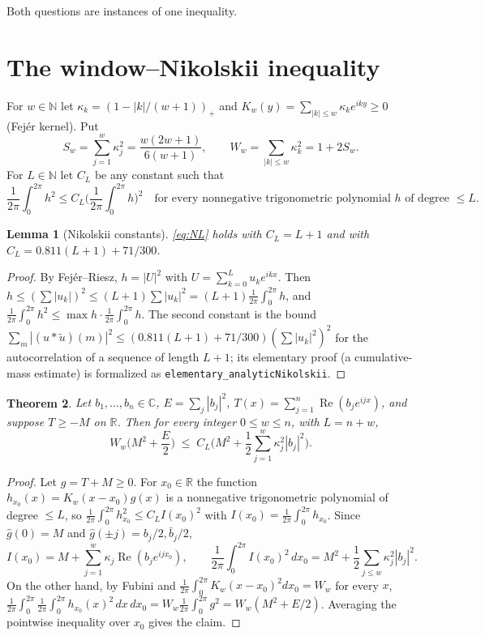\documentclass[11pt]{amsart}
\newtheorem{theorem}{Theorem}
\newtheorem{lemma}[theorem]{Lemma}
\theoremstyle{remark}
\newcommand{\R}{\mathbb{R}}
\newcommand{\N}{\mathbb{N}}
\newcommand{\avg}{\frac{1}{2\pi}\int_0^{2\pi}}
\begin{document}
Both questions are instances of one inequality.

\section{The window--Nikolskii inequality}
For $w\in\N$ let $\kappa_k=(1-|k|/(w+1))_+$ and $K_w(y)=\sum_{|k|\le w}\kappa_ke^{iky}\ge0$ (Fej\'er kernel). Put
\[
S_w=\sum_{j=1}^{w}\kappa_j^2=\frac{w(2w+1)}{6(w+1)},\qquad W_w=\sum_{|k|\le w}\kappa_k^2=1+2S_w .
\]
For $L\in\N$ let $C_L$ be any constant such that
\begin{equation}\label{eq:NL}
\avg h^2\le C_L\Big(\avg h\Big)^2\quad\text{for every nonnegative trigonometric polynomial $h$ of degree $\le L$.}
\end{equation}

\begin{lemma}[Nikolskii constants]\label{lem:nik}
\eqref{eq:NL} holds with $C_L=L+1$ and with $C_L=0.811(L+1)+71/300$.
\end{lemma}
\begin{proof}
By Fej\'er--Riesz, $h=|U|^2$ with $U=\sum_{k=0}^{L}u_ke^{ikx}$. Then $h\le(\sum|u_k|)^2\le(L+1)\sum|u_k|^2
=(L+1)\avg h$, and $\avg h^2\le\max h\cdot\avg h$. The second constant is the bound
$\sum_m|(u*\tilde u)(m)|^2\le(0.811(L+1)+71/300)(\sum|u_k|^2)^2$ for the autocorrelation of a sequence of length
$L+1$; its elementary proof (a cumulative-mass estimate) is formalized as \texttt{elementary\_analyticNikolskii}.
\end{proof}

\begin{theorem}\label{thm:main}
Let $b_1,\dots,b_n\in\mathbb C$, $E=\sum_j|b_j|^2$, $T(x)=\sum_{j=1}^n\operatorname{Re}(b_je^{ijx})$, and suppose
$T\ge-M$ on $\R$. Then for every integer $0\le w\le n$, with $L=n+w$,
\[
W_w\Big(M^2+\frac E2\Big)\;\le\;C_L\Big(M^2+\frac12\sum_{j=1}^{w}\kappa_j^2|b_j|^2\Big).
\]
\end{theorem}

\begin{proof}
Let $g=T+M\ge0$. For $x_0\in\R$ the function $h_{x_0}(x)=K_w(x-x_0)g(x)$ is a nonnegative trigonometric polynomial of
degree $\le L$, so $\avg h_{x_0}^2\le C_L I(x_0)^2$ with $I(x_0)=\avg h_{x_0}$. Since $\hat g(0)=M$ and
$\hat g(\pm j)=b_j/2,\bar b_j/2$,
\[
I(x_0)=M+\sum_{j=1}^{w}\kappa_j\operatorname{Re}(b_je^{ijx_0}),\qquad
\avg I(x_0)^2\,dx_0=M^2+\frac12\sum_{j\le w}\kappa_j^2|b_j|^2 .
\]
On the other hand, by Fubini and $\avg K_w(x-x_0)^2dx_0=W_w$ for every $x$,
$\avg\avg h_{x_0}(x)^2\,dx\,dx_0=W_w\avg g^2=W_w(M^2+E/2)$. Averaging the pointwise inequality over $x_0$ gives the claim.
\end{proof}
\end{document}
